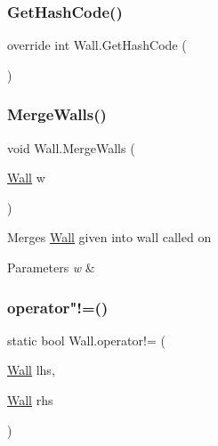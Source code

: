 \subsubsection{\texorpdfstring{Get\+Hash\+Code()}{GetHashCode()}}
{\footnotesize\ttfamily override int Wall.\+Get\+Hash\+Code (\begin{DoxyParamCaption}{ }\end{DoxyParamCaption})}

\mbox{\label{class_wall_a8104353e14b558c07aaef0a26f246418}} 
\subsubsection{\texorpdfstring{Merge\+Walls()}{MergeWalls()}}
{\footnotesize\ttfamily void Wall.\+Merge\+Walls (\begin{DoxyParamCaption}\item[{\mbox{\hyperlink{class_wall}{Wall}}}]{w }\end{DoxyParamCaption})}



Merges \mbox{\hyperlink{class_wall}{Wall}} given into wall called on 


\begin{DoxyParams}{Parameters}
{\em w} & \\
\hline
\end{DoxyParams}
\mbox{\label{class_wall_a12a6667a52ef86d8678ecb3cd21972e2}} 
\subsubsection{\texorpdfstring{operator"!=()}{operator!=()}}
{\footnotesize\ttfamily static bool Wall.\+operator!= (\begin{DoxyParamCaption}\item[{\mbox{\hyperlink{class_wall}{Wall}}}]{lhs,  }\item[{\mbox{\hyperlink{class_wall}{Wall}}}]{rhs }\end{DoxyParamCaption})\hspace{0.3cm}{\ttfamily [static]}}

\mbox{\label{class_wall_a0eaebc195033f236c71d8c812b6a0256}} 
